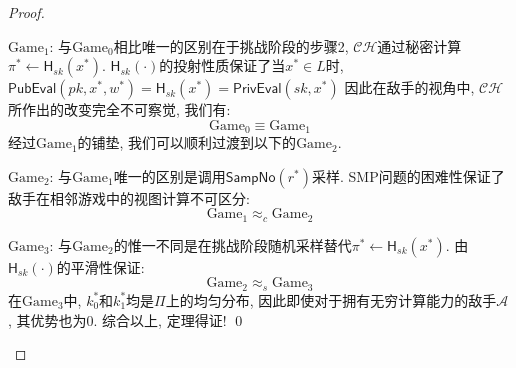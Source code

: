 \begin{proof}
\begin{trivlist}
\item $\text{Game}_1$: 与$\text{Game}_0$相比唯一的区别在于挑战阶段的步骤2, 
    $\mathcal{CH}$通过秘密计算$\pi^* \leftarrow \mathsf{H}_{sk}(x^*)$. 
    $\mathsf{H}_{sk}(\cdot)$的投射性质保证了当$x^* \in L$时, $\mathsf{PubEval}(pk, x^*, w^*) = \mathsf{H}_{sk}(x^*) = \mathsf{PrivEval}(sk, x^*)$
    因此在敌手的视角中, $\mathcal{CH}$所作出的改变完全不可察觉, 我们有:
    \begin{equation*}
        \text{Game}_0 \equiv \text{Game}_1
    \end{equation*}
经过$\text{Game}_1$的铺垫, 我们可以顺利过渡到以下的$\text{Game}_2$.
\item $\text{Game}_2$: 与$\text{Game}_1$唯一的区别是调用$\mathsf{SampNo}(r^*)$采样. 
    SMP问题的困难性保证了敌手在相邻游戏中的视图计算不可区分: 
    \begin{equation*}
        \text{Game}_1 \approx_c \text{Game}_2
    \end{equation*} 

\item $\text{Game}_3$: 与$\text{Game}_2$的惟一不同是在挑战阶段随机采样\redul{$\pi^* \sample \Pi$}替代$\pi^* \leftarrow \mathsf{H}_{sk}(x^*)$. 
    由$\mathsf{H}_{sk}(\cdot)$的平滑性保证:
    \begin{equation*}
        \text{Game}_2 \approx_s \text{Game}_3
    \end{equation*}
在$\text{Game}_3$中, $k_0^*$和$k_1^*$均是$\Pi$上的均匀分布, 因此即使对于拥有无穷计算能力的敌手$\mathcal{A}$, 其优势也为0. 综合以上, 定理得证! \qed             
\end{trivlist}
\end{proof}



